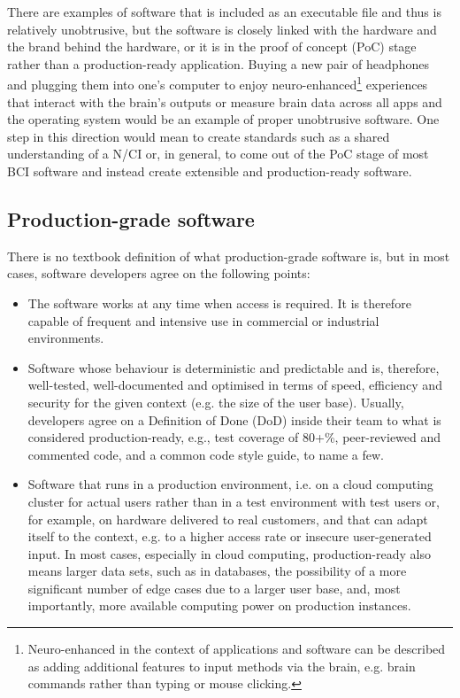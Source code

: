 There are examples of software that is included as an executable file and thus is relatively unobtrusive, but the software is closely linked with the hardware and the brand behind the hardware, or it is in the proof of concept (PoC) stage rather than a production-ready application. Buying a new pair of headphones and plugging them into one's computer to enjoy neuro-enhanced\footnote{Neuro-enhanced in the context of applications and software can be described as adding additional features to input methods via the brain, e.g. brain commands rather than typing or mouse clicking.} experiences that interact with the brain's outputs or measure brain data across all apps and the operating system would be an example of proper unobtrusive software. One step in this direction would mean to create standards such as a shared understanding of a N/CI or, in general, to come out of the PoC stage of most BCI software and instead create extensible and production-ready software.

\newpage
\subsection{Production-grade software}
\label{chapter2-production-grade-software}

There is no textbook definition of what production-grade software is, but in most cases, software developers agree on the following points:

\begin{itemize}
  \item The software works at any time when access is required. It is therefore capable of frequent and intensive use in commercial or industrial environments.
  \item Software whose behaviour is deterministic and predictable and is, therefore, well-tested, well-documented and optimised in terms of speed, efficiency and security for the given context (e.g. the size of the user base). Usually, developers agree on a Definition of Done (DoD) inside their team to what is considered production-ready, e.g., test coverage of 80+\%, peer-reviewed and commented code, and a common code style guide, to name a few.
  \item Software that runs in a production environment, i.e. on a cloud computing cluster for actual users rather than in a test environment with test users or, for example, on hardware delivered to real customers, and that can adapt itself to the context, e.g. to a higher access rate or insecure user-generated input. In most cases, especially in cloud computing, production-ready also means larger data sets, such as in databases, the possibility of a more significant number of edge cases due to a larger user base, and, most importantly, more available computing power on production instances.
\end{itemize}

